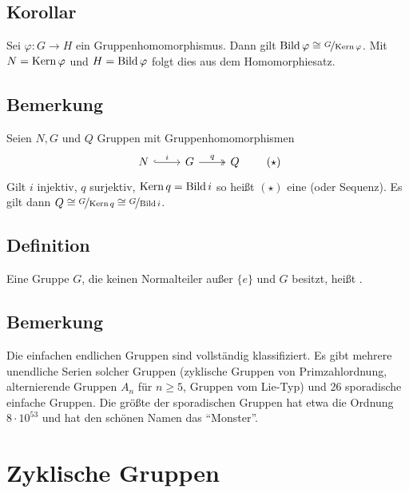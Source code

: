 \subsection[Korollar aus dem Homomorphiesatz]{Korollar} %
\label{sub:126}
Sei $\varphi : G \to H$ ein Gruppenhomomorphismus. Dann gilt $\operatorname{Bild} \varphi \cong \nicefrac{G}{\operatorname{Kern} \varphi}$. 
Mit $N = \operatorname{Kern} \varphi$ und $H= \operatorname{Bild} \varphi$ folgt dies aus dem Homomorphiesatz.

\subsection[Bemerkung: Kurze exakte Folge]{Bemerkung} %
\label{sub:127}
Seien $N,G$ und $Q$ Gruppen mit Gruppenhomomorphismen 
\[
	\begin{tikzcd}
		N \rar[hook]{i} & G \rar[two heads]{q} & Q
	\end{tikzcd}
	\tag{$\star$}
\]
Gilt $i$ injektiv, $q$ surjektiv,
$\operatorname{Kern} q = \operatorname{Bild} i$ so heißt $(\star)$ eine  (oder Sequenz). Es gilt dann $Q\cong \nicefrac{G}{\operatorname{Kern} q} \cong \nicefrac{G}{\operatorname{Bild} i}$.

\subsection[Definition: einfache Gruppe]{Definition} %
\label{sub:128}
Eine Gruppe $G$, die keinen Normalteiler außer $\{e\}$ und $G$ besitzt, heißt . 

\subsection[Bemerkung: Die einfachen endlichen Gruppen sind vollständig klassifiziert]{Bemerkung} %
\label{sub:129}
Die einfachen endlichen Gruppen sind vollständig klassifiziert. Es gibt mehrere unendliche Serien solcher Gruppen (zyklische Gruppen von Primzahlordnung, 
alternierende Gruppen $A_n$ für $n \ge 5$, Gruppen vom Lie-Typ) und 26 sporadische einfache Gruppen. Die größte der sporadischen Gruppen hat etwa die Ordnung 
$8 \cdot 10^{53}$ und hat den schönen Namen das \enquote{Monster}.
\newpage

\section{Zyklische Gruppen} %
\label{sec:2}

